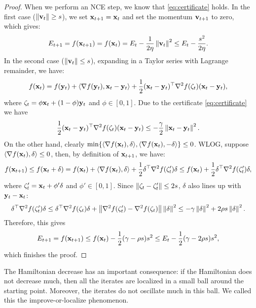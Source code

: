 \begin{proof}
When we perform an NCE step, we know that \eqref{eq:certificate} holds. In the first case ($\left\|{\mathbf{v}_t}\right\| \ge s$), we set $\mathbf{x}_{t+1}  = \mathbf{x}_t$ and set the momentum $\mathbf{v}_{t+1}$ to zero, which gives:
\begin{align*}
E_{t+1} = f(\mathbf{x}_{t+1}) = f(\mathbf{x}_t) = E_{t} - \frac{1}{2\eta}\left\|{\mathbf{v}_t}\right\|^2
\le E_{t} - \frac{s^2}{2\eta}.
\end{align*}
In the second case ($\left\|{\mathbf{v}_t}\right\| \le s$), expanding in a Taylor series with Lagrange remainder, we have:
\begin{equation*}
f(\mathbf{x}_t) =  f(\mathbf{y}_t) + \langle \nabla f(\mathbf{y}_t), \mathbf{x}_t - \mathbf{y}_t \rangle + \frac{1}{2} (\mathbf{x}_t - \mathbf{y}_t)^{\top} 
\nabla^2 f(\zeta_t) (\mathbf{x}_t - \mathbf{y}_t),
\end{equation*}
where $\zeta_t = \phi\mathbf{x}_t + (1-\phi)\mathbf{y}_t$ and $\phi \in [0, 1]$. Due to the certificate \eqref{eq:certificate} we have
\begin{equation*}
\frac{1}{2} (\mathbf{x}_t - \mathbf{y}_t)^{\top} 
\nabla^2 f(\zeta_t) (\mathbf{x}_t - \mathbf{y}_t) \le - \frac{\gamma}{2} \left\|{\mathbf{x}_t - \mathbf{y}_t}\right\|^2.
\end{equation*}
On the other hand, clearly $\min\{\langle \nabla f(\mathbf{x}_t), \delta\rangle, \langle \nabla f(\mathbf{x}_t), -\delta\rangle  \} \le 0$. WLOG, suppose $\langle \nabla f(\mathbf{x}_t), \delta\rangle \le 0$,
then, by definition of $\mathbf{x}_{t+1}$, we have:
\begin{equation*}
f(\mathbf{x}_{t+1}) \le f(\mathbf{x}_{t} + \delta) 
= f(\mathbf{x}_t) + \langle \nabla f(\mathbf{x}_t), \delta\rangle + \frac{1}{2} \delta^{\top} \nabla^2 f(\zeta'_t) \delta
\le  f(\mathbf{x}_t) + \frac{1}{2} \delta^{\top} 
\nabla^2 f(\zeta'_t) \delta,
\end{equation*}
where $\zeta'_t = \mathbf{x}_t + \phi'\delta$ and $\phi' \in [0, 1]$. 
Since $\left\|{\zeta_t - \zeta'_t}\right\| \le 2s$, $\delta$ also lines up
with $\mathbf{y}_t - \mathbf{x}_t$:
\begin{equation*}
\delta^{\top} 
\nabla^2 f(\zeta'_t) \delta
\le \delta^{\top} 
\nabla^2 f(\zeta_t) \delta
+ \left\|{\nabla^2 f(\zeta'_t) - \nabla^2 f(\zeta_t) }\right\|\left\|{\delta}\right\|^2
\le - \gamma \left\|{\delta}\right\|^2 + 2\rho s\left\|{\delta}\right\|^2.
\end{equation*}
Therefore, this gives
\begin{align*}
E_{t+1} = f(\mathbf{x}_{t+1}) \le f(\mathbf{x}_t) 
- \frac{1}{2}(\gamma - \rho s) s^2
\le E_{t} - \frac{1}{2}(\gamma - 2\rho s) s^2,
\end{align*}
which finishes the proof.
\end{proof}

The Hamiltonian decrease has an important consequence: if the Hamiltonian does not decrease much, then all the iterates are localized in a small ball around the starting point. Moreover, the iterates do not oscillate much in this ball. We called this the improve-or-localize phenomenon.


